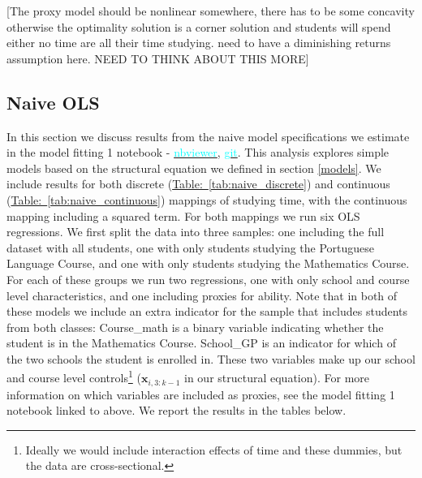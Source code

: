 \documentclass[12pt]{article}
\begin{document}
\textcolor{BlueGreen}{[The proxy model should be nonlinear somewhere, there has to be some concavity otherwise the optimality solution is a corner solution and students will spend either no time are all their time studying. need to have a diminishing returns assumption here. NEED TO THINK ABOUT THIS MORE]}


\subsection{Naive OLS}
In this section we discuss results from the naive model specifications we estimate in the model fitting 1 notebook -  \href{https://nbviewer.jupyter.org/github/nadavtadelis/Reproducible_Metrics/blob/master/model_fitting_1.ipynb}{\textcolor{cyan}{nbviewer}}, \href{https://github.com/nadavtadelis/Reproducible_Metrics/blob/master/model_fitting_1.ipynb}{\textcolor{cyan}{git}}. This analysis explores simple models based on the structural equation we defined in section \ref{models}. We include results for both discrete (\hyperref[tab:naive_discrete]{Table:~\ref*{tab:naive_discrete}}) and continuous (\hyperref[tab:naive_continuous]{Table:~\ref*{tab:naive_continuous}}) mappings of studying time, with the continuous mapping including a squared term. For both mappings we run six OLS regressions. We first split the data into three samples: one including the full dataset with all students, one with only students studying the Portuguese Language Course, and one with only students studying the Mathematics Course. For each of these groups we run two regressions, one with only school and course level characteristics, and one including proxies for ability. Note that in both of these models we include an extra indicator for the sample that includes students from both classes: Course\_math is a binary variable indicating whether the student is in the Mathematics Course. School\_GP is an indicator for which of the two schools the student is enrolled in. These two variables make up our school and course level controls\footnote{\textcolor{BlueGreen}{Ideally we would include interaction effects of time and these dummies, but the data are cross-sectional.}} ($\bm{x}_{i,3:k-1}$ in our structural equation). For more information on which variables are included as proxies, see the model fitting 1 notebook linked to above. We report the results in the tables below.
\end{document}
